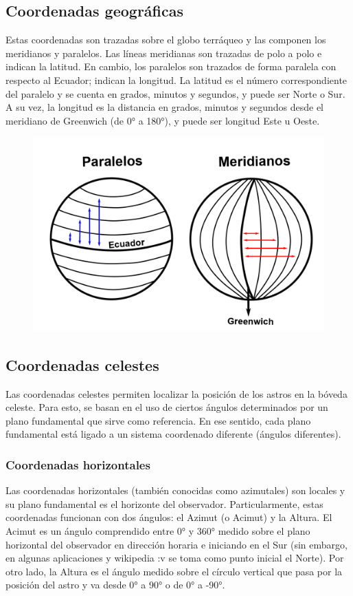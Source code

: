 \documentclass[10pt,a4paper]{article}
\begin{document}
\subsection{Coordenadas geográficas}
Estas coordenadas son trazadas sobre el globo terráqueo y las componen los meridianos y paralelos. Las líneas meridianas son trazadas de polo a polo e indican la latitud. En cambio, los paralelos son trazados de forma paralela con respecto al Ecuador; indican la longitud.
La latitud es el número correspondiente del paralelo y se cuenta en grados, minutos y segundos, y puede ser Norte o Sur. A su vez, la longitud es la distancia en grados, minutos y segundos desde el meridiano de Greenwich (de 0° a 180°), y puede ser longitud Este u Oeste.

\begin{figure}[H]
\centering
\includegraphics[scale=0.3]{Imagenes/Geograficas_01}
\end{figure}

\subsection{Coordenadas celestes}
Las coordenadas celestes permiten localizar la posición de los astros en la bóveda celeste. Para esto, se basan en el uso de ciertos ángulos determinados por un plano fundamental que sirve como referencia. En ese sentido, cada plano fundamental está ligado a un sistema coordenado diferente (ángulos diferentes).

\subsubsection{Coordenadas horizontales}
Las coordenadas horizontales (también conocidas como azimutales) son locales y su plano fundamental es el horizonte del observador. Particularmente, estas coordenadas funcionan con dos ángulos: el Azimut (o Acimut) y la Altura. El Acimut es un ángulo comprendido entre 0° y 360° medido sobre el plano horizontal del observador en dirección horaria e iniciando en el Sur (sin embargo, en algunas aplicaciones y wikipedia :v se toma como punto inicial el Norte). Por otro lado, la Altura es el ángulo medido sobre el círculo vertical que pasa por la posición del astro y va desde 0° a 90° o de 0° a -90°.
\end{document}
